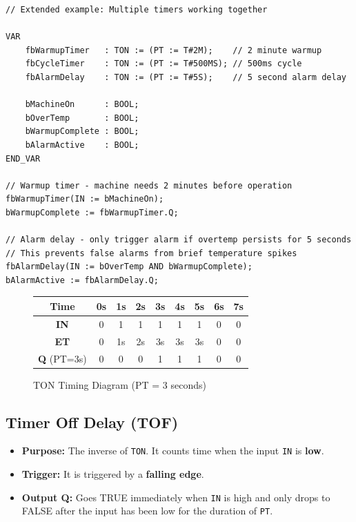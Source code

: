 \documentclass[11pt,a4paper]{article}
\begin{document}
\begin{lstlisting}
// Extended example: Multiple timers working together

VAR
    fbWarmupTimer   : TON := (PT := T#2M);    // 2 minute warmup
    fbCycleTimer    : TON := (PT := T#500MS); // 500ms cycle
    fbAlarmDelay    : TON := (PT := T#5S);    // 5 second alarm delay
    
    bMachineOn      : BOOL;
    bOverTemp       : BOOL;
    bWarmupComplete : BOOL;
    bAlarmActive    : BOOL;
END_VAR

// Warmup timer - machine needs 2 minutes before operation
fbWarmupTimer(IN := bMachineOn);
bWarmupComplete := fbWarmupTimer.Q;

// Alarm delay - only trigger alarm if overtemp persists for 5 seconds
// This prevents false alarms from brief temperature spikes
fbAlarmDelay(IN := bOverTemp AND bWarmupComplete);
bAlarmActive := fbAlarmDelay.Q;
\end{lstlisting}

\begin{figure}[h]
\centering
\begin{tabular}{|c|c|c|c|c|c|c|c|c|}
\hline
\textbf{Time} & 0s & 1s & 2s & 3s & 4s & 5s & 6s & 7s \\
\hline
\textbf{IN} & 0 & 1 & 1 & 1 & 1 & 1 & 0 & 0 \\
\hline
\textbf{ET} & 0 & 1s & 2s & 3s & 3s & 3s & 0 & 0 \\
\hline
\textbf{Q} (PT=3s) & 0 & 0 & 0 & 1 & 1 & 1 & 0 & 0 \\
\hline
\end{tabular}
\caption{TON Timing Diagram (PT = 3 seconds)}
\end{figure}

\subsection{Timer Off Delay (TOF)}

\begin{itemize}[leftmargin=*]
    \item \textbf{Purpose:} The inverse of \texttt{TON}. It counts time when the input \texttt{IN} is \textbf{low}.
    \item \textbf{Trigger:} It is triggered by a \textbf{falling edge}.
    \item \textbf{Output Q:} Goes TRUE immediately when \texttt{IN} is high and only drops to FALSE after the input has been low for the duration of \texttt{PT}.
\end{itemize}
\end{document}
